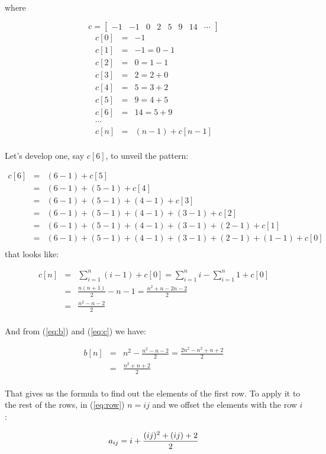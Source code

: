 \documentclass[12pt]{article}
\begin{document}
where

\begin{equation}
c = \begin{bmatrix}-1 & -1 & 0 & 2 & 5 & 9 & 14 & \cdots\end{bmatrix}\nonumber
\end{equation}    
\begin{eqnarray*}
c[0] &=& -1\\
c[1] &=& -1 = 0 - 1\\
c[2] &=&  0 = 1 - 1\\
c[3] &=&  2 = 2 + 0\\
c[4] &=&  5 = 3 + 2\\
c[5] &=&  9 = 4 + 5\\
c[6] &=& 14 = 5 + 9\\
\cdots&\\
c[n] &=& (n-1) + c[n-1]\\
\end{eqnarray*}

Let's develop one, say $c[6]$, to unveil the pattern:

\begin{eqnarray*}
c[6] &=& (6-1) + c[5]\\
     &=& (6-1) + (5-1) + c[4]\\
     &=& (6-1) + (5-1) + (4-1) + c[3]\\
     &=& (6-1) + (5-1) + (4-1) + (3-1) + c[2]\\
     &=& (6-1) + (5-1) + (4-1) + (3-1) + (2-1) + c[1]\\
     &=& (6-1) + (5-1) + (4-1) + (3-1) + (2-1) + (1-1) + c[0]\\
\end{eqnarray*}
that looks like:

\begin{eqnarray} 
c[n] &=& \sum_{i=1}^{n} (i-1) + c[0]\nonumber
= \sum_{i=1}^{n}i - \sum_{i=1}^{n} 1 + c[0]\nonumber\\
     &=& \frac{n(n+1)}{2} - n -1\nonumber
     = \frac{n^2 + n - 2n - 2}{2}\nonumber\\
     &=& \frac{n^2 - n - 2}{2}\label{eq:c}\nonumber\\
\end{eqnarray}

And from (\ref{eq:b}) and (\ref{eq:c}) we have:

\begin{eqnarray}
b[n] &=& n^2 - \frac{n^2 - n - 2}{2}\nonumber
     = \frac{2n^2 - n^2 + n + 2}{2}\nonumber\\
     &=& \frac{n^2 +n +2 }{2}\label{eq:row}\nonumber\\
\end{eqnarray}

That gives us the formula to find out the elements of the first row.
To apply it to the rest of the rows, in (\ref{eq:row}) $n = i j$ and we offset the elements with the row $i$:

\begin{equation}
    a_{ij} =  i + \frac{(ij)^2+(ij)+2}{2}\label{eq:row1}\nonumber\\
\end{equation}
\end{document}
